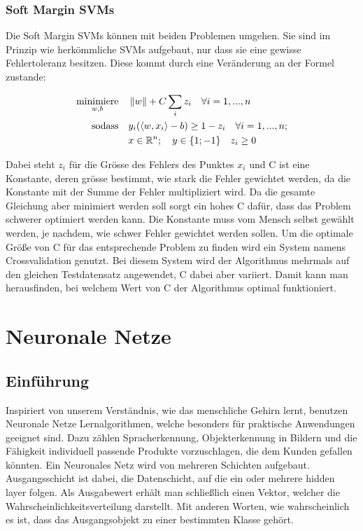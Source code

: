 \subsubsection{Soft Margin SVMs}
Die Soft Margin SVMs können mit beiden Problemen umgehen.
Sie sind im Prinzip wie herkömmliche SVMs aufgebaut, nur dass sie eine gewisse Fehlertoleranz besitzen. Diese kommt durch eine Veränderung an der Formel zustande:

\begin{align*}
	\underset{w,b}{\operatorname{minimiere}} \quad & \left\lVert w\right\rVert + C\sum_{i}{z_{i}} \quad \forall i = 1,...,n \\
	\operatorname{sodass} \quad & y_{i}(\langle w,x_{i} \rangle - b) \geq 1 - z_{i} \quad \forall i = 1,...,n; \\ 
	&x \in \mathbb{R}^n; \quad y \in \{1; -1\} \quad z_{i} \geq 0 \\
\end{align*}

Dabei steht $z_{i}$ für die Grösse des Fehlers des Punktes $x_{i}$ und C ist eine Konstante, deren grösse bestimmt, wie stark die Fehler gewichtet werden, da die Konstante mit der Summe der Fehler multipliziert wird. Da die gesamte Gleichung aber minimiert werden soll sorgt ein hohes C dafür, dass das Problem schwerer optimiert werden kann. Die Konstante muss vom Mensch selbst gewählt werden, je nachdem, wie schwer Fehler gewichtet werden sollen.
Um die optimale Größe von C für das entsprechende Problem zu finden wird ein System namens Crossvalidation genutzt. Bei diesem System wird der Algorithmus mehrmals auf den gleichen Testdatensatz angewendet, C dabei aber variiert. Damit kann man herausfinden, bei welchem Wert von C der Algorithmus optimal funktioniert.


\section{Neuronale Netze}
\author {Farhadiba Mohammed}

\subsection{Einführung}

Inspiriert von unserem Verständnis, wie das menschliche Gehirn lernt, benutzen Neuronale Netze Lernalgorithmen, welche besonders für praktische Anwendungen geeignet sind.
Dazu zählen Spracherkennung, Objekterkennung in Bildern und die Fähigkeit individuell passende Produkte vorzuschlagen, die dem Kunden gefallen könnten. 
Ein Neuronales Netz wird von mehreren Schichten aufgebaut. Ausgangsschicht ist dabei, die Datenschicht, auf die ein oder mehrere hidden layer folgen. Als Ausgabewert erhält man schließlich einen Vektor, welcher die Wahrscheinlichkeitsverteilung darstellt. Mit anderen Worten, wie wahrscheinlich es ist, dass das Ausgangsobjekt zu einer bestimmten Klasse gehört.

